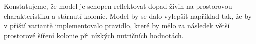 \documentclass{article}
\begin{document}
Konstatujeme, že model je schopen reflektovat dopad živin na prostorovou charakteristiku a stárnutí kolonie. Model by se dalo vylepšit například tak, že by v příští variantě implementovalo pravidlo, které by mělo za následek větší prostorové šíření kolonie při nízkých nutričních hodnotách. 
\printbibliography
\end{document}
